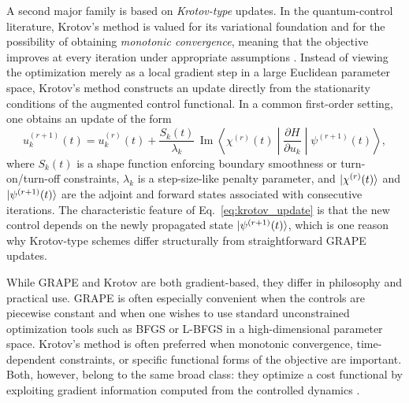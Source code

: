 A second major family is based on \emph{Krotov-type} updates. In the quantum-control literature, Krotov's method is valued for its variational foundation and for the possibility of obtaining \emph{monotonic convergence}, meaning that the objective improves at every iteration under appropriate assumptions \cite{Palao2003,Reich2012}. Instead of viewing the optimization merely as a local gradient step in a large Euclidean parameter space, Krotov's method constructs an update directly from the stationarity conditions of the augmented control functional. In a common first-order setting, one obtains an update of the form
\begin{equation}
u_k^{(r+1)}(t)
=
u_k^{(r)}(t)
+
\frac{S_k(t)}{\lambda_k}
\,\operatorname{Im}
\left\langle
\chi^{(r)}(t)
\middle|
\frac{\partial H}{\partial u_k}
\middle|
\psi^{(r+1)}(t)
\right\rangle,
\label{eq:krotov_update}
\end{equation}
where $S_k(t)$ is a shape function enforcing boundary smoothness or turn-on/turn-off constraints, $\lambda_k$ is a step-size-like penalty parameter, and $\ket{\chi^{(r)}(t)}$ and $\ket{\psi^{(r+1)}(t)}$ are the adjoint and forward states associated with consecutive iterations. The characteristic feature of Eq.~\eqref{eq:krotov_update} is that the new control depends on the newly propagated state $\ket{\psi^{(r+1)}(t)}$, which is one reason why Krotov-type schemes differ structurally from straightforward GRAPE updates.

While GRAPE and Krotov are both gradient-based, they differ in philosophy and practical use. GRAPE is often especially convenient when the controls are piecewise constant and when one wishes to use standard unconstrained optimization tools such as BFGS or L-BFGS in a high-dimensional parameter space. Krotov's method is often preferred when monotonic convergence, time-dependent constraints, or specific functional forms of the objective are important. Both, however, belong to the same broad class: they optimize a cost functional by exploiting gradient information computed from the controlled dynamics \cite{Khaneja2005,Reich2012}.

